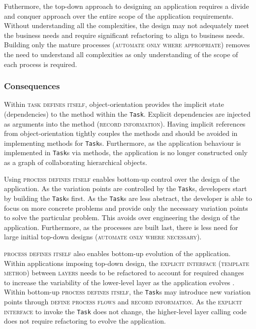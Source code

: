 \documentclass[prodmode]{style/acmlarge}
\begin{document}
Futhermore, the top-down approach to designing an application requires a divide
and conquer approach over the entire scope of the application requirements.
Without understanding all the complexities, the design may not adequately meet
the business needs and require significant refactoring to align to business
needs.  Building only the mature processes (\textsc{automate only where
appropriate}) removes the need to understand all complexities as only
understanding of the scope of each process is required.


\subsubsection*{Consequences}

Within \textsc{task defines itself}, object-orientation provides the implicit
state (dependencies) to the method within the \texttt{Task}.  Explicit
dependencies are injected as arguments into the method (\textsc{record
information}).  Having implicit references from object-orientation tightly
couples the methods and should be avoided in implementing methods for
\texttt{Task}s.  Furthermore, as the application behaviour is implemented in
\texttt{Task}s via methods, the application is no longer constructed only as a
graph of collaborating hierarchical objects.

Using \textsc{process defines itself} enables bottom-up control over the design
of the application.  As the variation points are controlled by the
\texttt{Task}s, developers start by building the \texttt{Task}s first.  As
the \texttt{Task}s are less abstract, the developer is able to focus on more
concrete problems and provide only the necessary variation points to solve the
particular problem.  This avoids over engineering the design of the application.
 Furthermore, as the processes are built last, there is less need for large
initial top-down designs (\textsc{automate only where necessary}).

\textsc{process defines itself} also enables bottom-up evolution of the
application.  Within applications imposing top-down design, the
\textsc{explicit interface} (\textsc{template method}) between \textsc{layers}
needs to be refactored to account for required changes to increase the
variability of the lower-level layer as the application evolves \cite{ioc}. 
Within bottom-up \textsc{process defines itself}, the \texttt{Task}s may
introduce new variation points through \textsc{define process flows} and
\textsc{record information}.  As the \textsc{explicit interface} to invoke the
\texttt{Task} does not change, the higher-level layer calling code does not
require refactoring to evolve the application.
\end{document}

